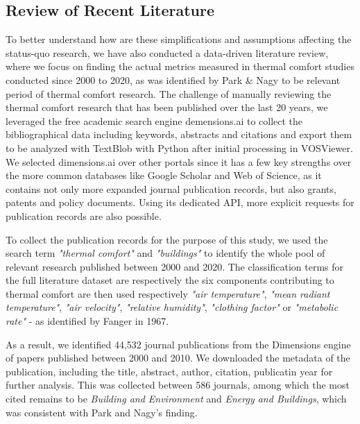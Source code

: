 \subsection{Review of Recent Literature}
    To better understand how are these simplifications and assumptions affecting the status-quo research, we have also conducted a data-driven literature review, where we focus on finding the actual metrics measured in thermal comfort studies conducted since 2000 to 2020, as was identified by Park \& Nagy \cite{park_comprehensive_2018} to be relevant period of thermal comfort research. The challenge of manually reviewing the thermal comfort research that has been published over the last 20 years, we leveraged the free academic search engine demensions.ai to collect the bibliographical data including keywords, abstracts and citations and export them to be analyzed with TextBlob with Python after initial processing in VOSViewer. We selected dimensions.ai over other portals since it has a few key strengths over the more common databases like Google Scholar and Web of Science, as it contains not only more expanded journal publication records, but also grants, patents and policy documents. Using its dedicated API, more explicit requests for publication records are also possible. 

    To collect the publication records for the purpose of this study, we used the search term \textit{"thermal comfort"} and \textit{"buildings"} to identify the whole pool of relevant research published between 2000 and 2020. The classification terms for the full literature dataset are respectively the six components contributing to thermal comfort are then used respectively \textit{"air temperature"}, \textit{"mean radiant temperature"}, \textit{"air velocity"}, \textit{"relative humidity"}, \textit{"clothing factor"} or \textit{"metabolic rate"} - as identified by Fanger in 1967\cite{fanger_calculation_1967}. 

    As a result, we identified 44,532 journal publications from the Dimensions engine of papers published between 2000 and 2010. We downloaded the metadata of the publication, including the title, abstract, author, citation, publicatin year for further analysis. This was collected between 586 journals, among which the most cited remains to be \textit{Building and Environment} and \textit{Energy and Buildings}, which was consistent with Park and Nagy's finding\cite{park_comprehensive_2018}. 